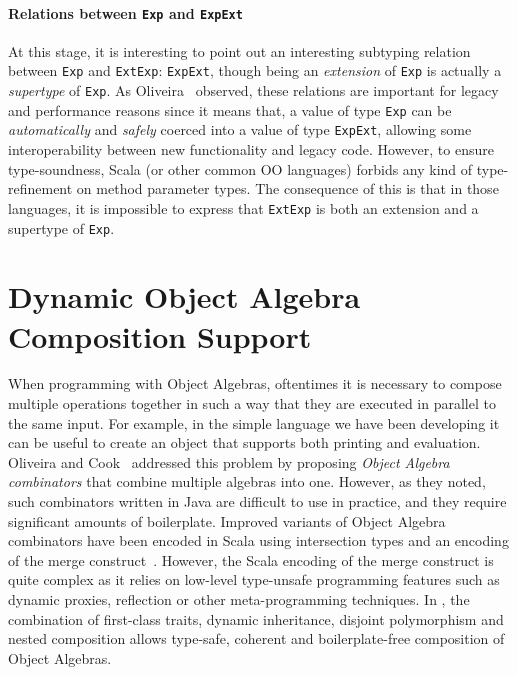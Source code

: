 \paragraph{Relations between \lstinline{Exp} and \lstinline{ExpExt}}
At this stage, it is interesting to point out an interesting subtyping relation
between \lstinline{Exp} and \lstinline{ExtExp}: \lstinline{ExpExt}, though being an
\emph{extension} of \lstinline{Exp} is actually a \emph{supertype} of \lstinline{Exp}.
As Oliveira~\cite{oliveira09modular} observed, these relations are
important for legacy and performance reasons since it means that, a value of
type \lstinline{Exp} can be \emph{automatically} and \emph{safely}
coerced into a value of type \lstinline{ExpExt}, allowing some
interoperability between new functionality and legacy code.
However, to ensure type-soundness, Scala (or other common OO languages) forbids any kind of type-refinement on method
parameter types. The consequence of this is that in those languages, it is
impossible to express that \lstinline{ExtExp} is both an extension and a
supertype of \lstinline{Exp}.




\section{Dynamic Object Algebra Composition Support}

When programming with Object Algebras, oftentimes it is necessary to compose
multiple operations together in such a way that they are executed in parallel to
the same input. For example, in the simple language we have been developing it
can be useful to create an object that supports both printing and evaluation.
Oliveira and Cook~\cite{oliveira2012extensibility} addressed this problem by
proposing \emph{Object Algebra combinators} that combine multiple algebras into
one. However, as they noted, such combinators written in Java are difficult to
use in practice, and they require significant amounts of boilerplate. Improved
variants of Object Algebra combinators have been encoded in Scala using
intersection types and an encoding of the merge
construct~\cite{oliveira2013feature, rendel14attributes}. However, the Scala
encoding of the merge construct is quite complex as it relies on low-level
type-unsafe programming features such as dynamic proxies, reflection or other
meta-programming techniques. In \sedel, the combination of first-class traits,
dynamic inheritance, disjoint polymorphism and nested composition allows type-safe, coherent and
boilerplate-free composition of Object Algebras.

